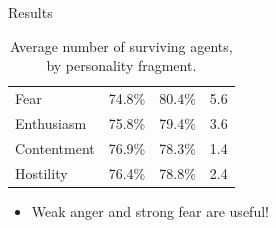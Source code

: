 \begin{frame}{Results}
\begin{table}
{\begin{tabular}{ l | c | c | c}
                     \rowcolor{LightYellow}Fear&74.8\%&\cellcolor{IntenseYellow}80.4\% & 5.6\\
                     Enthusiasm & 75.8\% & 79.4\% & 3.6\\
                     Contentment & 76.9\% & 78.3\% & 1.4\\
                     Hostility & 76.4\% & 78.8\% & 2.4\\
                     \hline
                  \end{tabular}}
                  \caption{Average number of surviving agents, by personality fragment.}
                  \label{tab:numAgentsAvg}
               \end{table}
               
               \begin{itemize}
                  \item<3-> Weak anger and strong fear are useful!
               \end{itemize}
            \end{frame}
            
